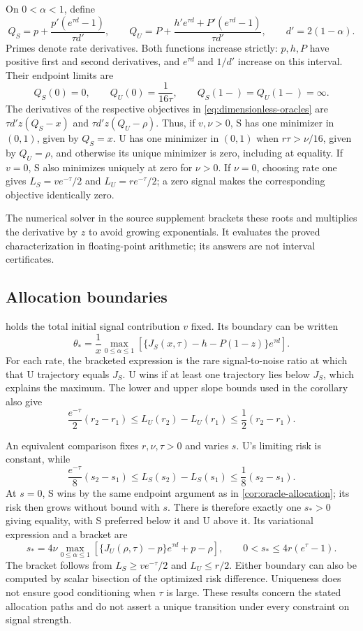 On $0<\alpha<1$, define
\[
  Q_S=p+\frac{p'(e^{\tau d}-1)}{\tau d'},\qquad
  Q_U=P+\frac{h'e^{\tau d}+P'(e^{\tau d}-1)}{\tau d'},
  \qquad d'=2(1-\alpha).
\]
Primes denote rate derivatives. Both functions increase strictly: $p,h,P$ have
positive first and second derivatives, and $e^{\tau d}$ and $1/d'$ increase
on this interval. Their endpoint limits are
\[
  Q_S(0)=0,\qquad Q_U(0)=\frac{1}{16\tau},\qquad
  Q_S(1-)=Q_U(1-)=\infty.
\]
The derivatives of the respective objectives in
\cref{eq:dimensionless-oracles} are $\tau d'z(Q_S-x)$ and
$\tau d'z(Q_U-\rho)$. Thus, if $v,\nu>0$, S has one minimizer in $(0,1)$,
given by $Q_S=x$. U has one minimizer in $(0,1)$ when
$r\tau>\nu/16$, given by $Q_U=\rho$, and otherwise its unique minimizer is
zero, including at equality. If $v=0$, S also minimizes uniquely at zero for
$\nu>0$. If $\nu=0$, choosing rate one gives
$L_S=ve^{-\tau}/2$ and $L_U=re^{-\tau}/2$; a zero signal makes the
corresponding objective identically zero.

The numerical solver in the source supplement brackets
these roots and multiplies the derivative by $z$ to avoid growing exponentials.
It evaluates the proved characterization in floating-point arithmetic; its
answers are not interval certificates.

\subsection{Allocation boundaries}

 holds the total initial signal contribution $v$
fixed. Its boundary can be written
\begin{equation}
  \theta_*=
  \frac1x\max_{0\leq\alpha\leq1}
    \left[\{J_S(x,\tau)-h-P(1-z)\}e^{\tau d}\right].
  \label{eq:allocation-boundary}
\end{equation}
For each rate, the bracketed expression is the rare signal-to-noise ratio at
which that U trajectory equals $J_S$. U wins if at least one trajectory lies
below $J_S$, which explains the maximum. The lower and upper slope bounds used
in the corollary also give
\[
  \frac{e^{-\tau}}2(r_2-r_1)
  \leq L_U(r_2)-L_U(r_1)\leq\frac12(r_2-r_1).
\]

An equivalent comparison fixes $r,\nu,\tau>0$ and varies $s$. U's limiting
risk is constant, while
\[
  \frac{e^{-\tau}}8(s_2-s_1)
  \leq L_S(s_2)-L_S(s_1)\leq\frac18(s_2-s_1).
\]
At $s=0$, S wins by the same endpoint argument as in
\cref{cor:oracle-allocation}; its risk then grows without bound with $s$.
There is therefore exactly one $s_*>0$ giving equality, with S preferred below
it and U above it. Its variational expression and a bracket are
\[
  s_*=4\nu\max_{0\leq\alpha\leq1}
    \left[\{J_U(\rho,\tau)-p\}e^{\tau d}+p-\rho\right],
  \qquad 0<s_*\leq4r(e^\tau-1).
\]
The bracket follows from $L_S\geq ve^{-\tau}/2$ and $L_U\leq r/2$.
Either boundary can also be computed by scalar bisection of the optimized risk
difference. Uniqueness does not ensure good conditioning when $\tau$ is large.
These results concern the stated allocation paths and do not assert a unique
transition under every constraint on signal strength.

